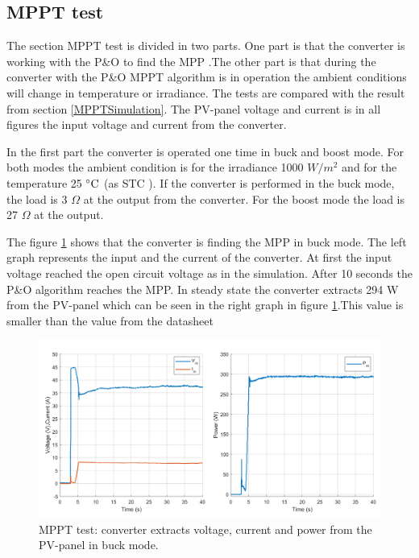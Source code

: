 \subsection{MPPT test}
The section MPPT test is divided in two parts. One part is that the converter is working with the P\&O to find the MPP .The other part is that during the converter with the P\&O MPPT algorithm is in operation the ambient conditions will change in temperature or irradiance. The tests are compared with the result from section \ref{MPPTSimulation}. The PV-panel voltage and current is in all figures the input voltage and current from the converter.

In the first part the converter is operated one time in buck and boost mode. For both modes the ambient condition is for the irradiance 1000 $W /m^2$ and for the temperature 25 $\decC$ (as STC ). If the converter is performed in the buck mode, the load is 3 $\Omega$ at the output from the converter. For the boost mode the load is 27 $\Omega$ at the output.

The figure \ref{MPPTtestbuckmode1} shows that the converter is finding the MPP in buck mode. The left graph represents the input and the current of the converter. At first the input voltage reached the open circuit voltage as in the simulation.  After 10 seconds the P\&O algorithm reaches the MPP. In steady state the converter extracts 294 W from the PV-panel which can be seen in the right graph in figure \ref{MPPTtestbuckmode1}.This value is smaller than the value from the datasheet \cite{PV_panel}

\begin{figure}[H]
	\begin{center}
		\includegraphics[width=1\textwidth]{../Pictures/P1/Test/Buck_mode_MPPT_Vin_Iin_Pin}
		\caption{MPPT test: converter extracts voltage, current and power from the PV-panel in buck mode.}
		\label{MPPTtestbuckmode1}
	\end{center}	
\end{figure}

